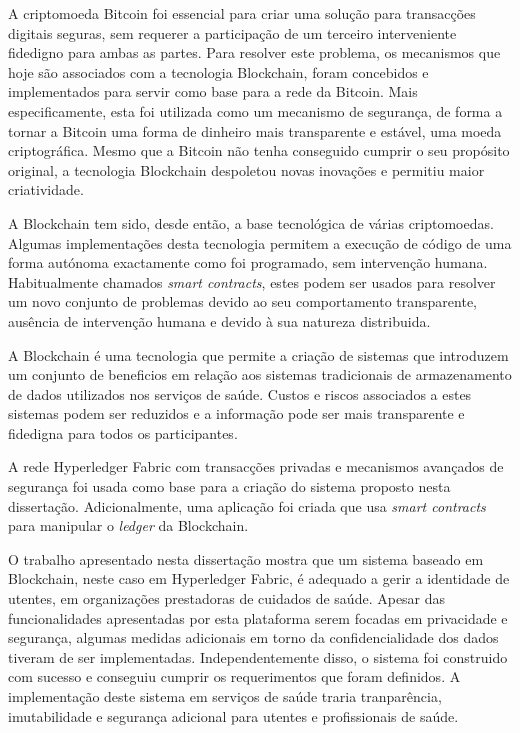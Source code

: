 \begin{tueSUMARIO}

  A criptomoeda Bitcoin foi essencial para criar uma solução para transacções
  digitais seguras, sem requerer a participação de um terceiro interveniente
  fidedigno para ambas as partes.  Para resolver este problema, os mecanismos
  que hoje são associados com a tecnologia Blockchain, foram concebidos e
  implementados para servir como base para a rede da Bitcoin. Mais
  especificamente, esta foi utilizada como um mecanismo de segurança, de forma
  a tornar a Bitcoin uma forma de dinheiro mais transparente e estável, uma
  moeda criptográfica. Mesmo que a Bitcoin não tenha conseguido cumprir o seu
  propósito original, a tecnologia Blockchain despoletou novas inovações e
  permitiu maior criatividade.

  A Blockchain tem sido, desde então, a base tecnológica de várias
  criptomoedas. Algumas implementações desta tecnologia permitem a execução de
  código de uma forma autónoma exactamente como foi programado, sem intervenção
  humana.  Habitualmente chamados \textit{smart contracts}, estes podem ser
  usados para resolver um novo conjunto de problemas devido ao seu
  comportamento transparente, ausência de intervenção humana e devido à sua
  natureza distribuida. 

  A Blockchain é uma tecnologia que permite a criação de sistemas que
  introduzem um conjunto de beneficios em relação aos sistemas tradicionais de
  armazenamento de dados utilizados nos serviços de saúde. Custos e riscos
  associados a estes sistemas podem ser reduzidos e a informação pode ser mais
  transparente e fidedigna para todos os participantes.

  A rede Hyperledger Fabric com transacções privadas e mecanismos avançados de
  segurança foi usada como base para a criação do sistema proposto nesta
  dissertação. Adicionalmente, uma aplicação foi criada que usa \textit{smart
  contracts} para manipular o \textit{ledger} da Blockchain.

  O trabalho apresentado nesta dissertação mostra que um sistema baseado em
  Blockchain, neste caso em Hyperledger Fabric, é adequado a gerir a identidade
  de utentes,  em organizações prestadoras de cuidados de saúde. Apesar das
  funcionalidades apresentadas por esta plataforma serem focadas em privacidade
  e segurança, algumas medidas adicionais em torno da confidencialidade dos
  dados tiveram de ser implementadas. Independentemente disso, o sistema foi
  construido com sucesso e conseguiu cumprir os requerimentos que foram
  definidos. A implementação deste sistema em serviços de saúde traria
  tranparência, imutabilidade e segurança adicional para utentes e
  profissionais de saúde.

\end{tueSUMARIO}
